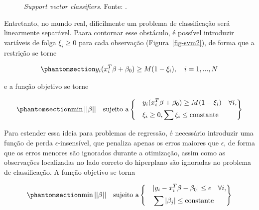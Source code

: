 \documentclass[
  12pt,
  twoside,
  openright,
  a4paper,
  chapter=TITLE,
  section=TITLE,
  brazil]{abntex2}
\begin{document}
\begin{apendicesenv}
\begin{figure}
\begin{minipage}{\linewidth}
{}


\end{minipage}%

\caption{\label{fig-svm}\emph{Support vector classifiers}. Fonte:
\textcite{hastie_elements_2009}.}

\end{figure}%

Entretanto, no mundo real, dificilmente um problema de classificação
será linearmente separável. Paara contornar esse obstáculo, é possível
introduzir variáveis de folga \(\xi_i \geq 0\) para cada observação
(Figura~\ref{fig-svm2}), de forma que a restrição se torne

\begin{equation}\phantomsection\label{eq-svm2}{
y_i(x_i^T\beta + \beta_0) \geq M(1 - \xi_i), \quad i = 1, ..., N
}\end{equation}

\noindent e a função objetivo se torne

\begin{equation}\phantomsection\label{eq-svm3}{
\min{||\beta||} \quad \text{sujeito a}
\left\{
  \begin{aligned}
    &\quad y_i(x_i^T\beta + \beta_0) \geq M(1 - \xi_i) \quad \forall i, \\
    &\quad \xi_i \geq 0, \sum{\xi_i} \leq \text{constante}
  \end{aligned}
\right\}
}\end{equation}

Para estender essa ideia para problemas de regressão, é necessário
introduzir uma função de perda \(\epsilon\)-insensível, que penaliza
apenas os erros maiores que \(\epsilon\), de forma que os erros menores
são ignorados durante a otimização, assim como as observações
localizadas no lado correto do hiperplano são ignoradas no problema de
classificação. A função objetivo se torna

\begin{equation}\phantomsection\label{eq-svm4}{
\min{||\beta||} \quad \text{sujeito a}
\left\{
  \begin{aligned}
    &\quad |y_i - x_i^T\beta - \beta_0| \leq \epsilon \quad \forall i, \\
    &\quad \sum{|\beta_j|} \leq \text{constante}
  \end{aligned}
\right\}
}\end{equation}


\end{apendicesenv}
\end{document}

